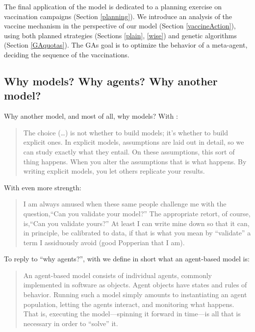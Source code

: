 \documentclass[graybox]{svmult}
\begin{document}
The final application of the model is dedicated to a planning exercise on vaccination campaigns (Section \ref{planning}). We introduce an analysis of the vaccine mechanism in the perspective of our model (Section \ref{vaccineAction}), using both planned strategies (Sections \ref{plain}, \ref{wise}) and genetic algorithms (Section \ref{GAquotas}). The GAs goal is to optimize the behavior of a meta-agent, deciding the sequence of the vaccinations.


\subsection{Why models? Why agents? Why another model?}
\label{why}

Why another model, and most of all, why models? With \cite{epstein2008model}:
\begin{quote}
The choice (\ldots) is not whether to build models; it's whether to build explicit ones. In explicit models, assumptions are laid out in detail, so we can study exactly what they entail. On these assumptions, this sort of thing happens. When you alter the assumptions that is what happens. By writing explicit models, you let others replicate your results.
\end{quote}

With even more strength:
\begin{quote} 
I am always amused when these same people challenge me with the question,``Can you validate your model?'' The appropriate retort, of course, is,``Can you validate yours?'' At least I can write mine down so that it can, in principle, be calibrated to data, if that is what you mean by ``validate'' a term I assiduously avoid (good Popperian that I am).
\end{quote}

To reply to ``why agents?'', with \cite{axtell2000agents} we define in short what an agent-based model is:
\begin{quote} 
An agent-based model consists of individual agents, commonly implemented in software as objects. Agent objects have states and rules of behavior. Running such a model simply amounts to instantiating an agent population, letting the agents interact, and monitoring what happens. That is, executing the model---spinning it forward in time---is all that is necessary in order to ``solve'' it.
\end{quote}
\end{document}
